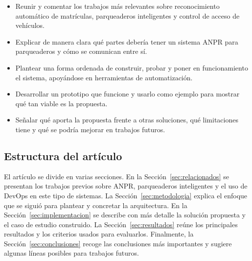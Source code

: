 \begin{itemize}
    \item Reunir y comentar los trabajos más relevantes sobre reconocimiento automático de matrículas, parqueaderos inteligentes y control de acceso de vehículos.
    \item Explicar de manera clara qué partes debería tener un sistema ANPR para parqueaderos y cómo se comunican entre sí.
    \item Plantear una forma ordenada de construir, probar y poner en funcionamiento el sistema, apoyándose en herramientas de automatización.
    \item Desarrollar un prototipo que funcione y usarlo como ejemplo para mostrar qué tan viable es la propuesta.
    \item Señalar qué aporta la propuesta frente a otras soluciones, qué limitaciones tiene y qué se podría mejorar en trabajos futuros.
\end{itemize}

\subsection{Estructura del artículo}

El artículo se divide en varias secciones. En la Sección~\ref{sec:relacionados} se presentan los trabajos previos sobre ANPR, parqueaderos inteligentes y el uso de DevOps en este tipo de sistemas. La Sección~\ref{sec:metodologia} explica el enfoque que se siguió para plantear y concretar la arquitectura. En la Sección~\ref{sec:implementacion} se describe con más detalle la solución propuesta y el caso de estudio construido. La Sección~\ref{sec:resultados} reúne los principales resultados y los criterios usados para evaluarlos. Finalmente, la Sección~\ref{sec:conclusiones} recoge las conclusiones más importantes y sugiere algunas líneas posibles para trabajos futuros.